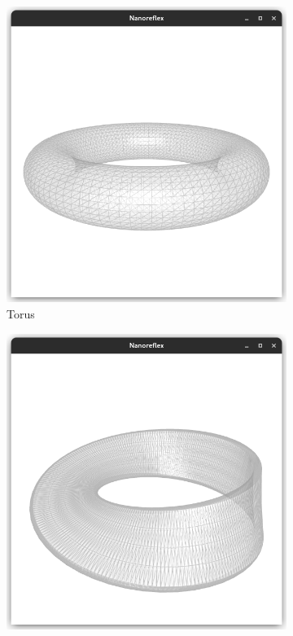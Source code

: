 \documentclass{stdlocal}
\begin{document}

  \begin{figure}[t]
    \centering
    \begin{subfigure}[b]{0.32\linewidth}
      \centering
      \includegraphics[width=\linewidth,trim={25px 50 25 200},clip]{images/polyhedral-surface-torus.png}
      \caption{Torus}
    \end{subfigure}
    \hfill
    \begin{subfigure}[b]{0.32\linewidth}
      \centering
      \includegraphics[width=\linewidth,trim={25px 50 25 200},clip]{images/polyhedral-surface-mobius-thick.png}

\end{subfigure}
\end{figure}
\end{document}
